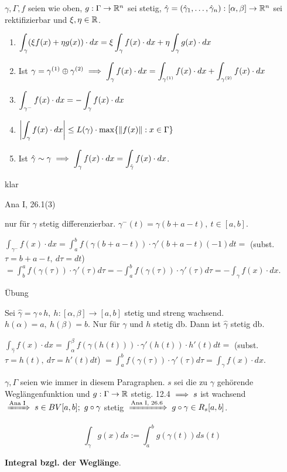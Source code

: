 \documentclass[a4paper,oneside,DIV15,BCOR12mm,chapterprefix=true,headings=onelinechapter]{scrbook}
\begin{document}
\begin{satz}
$\gamma,\Gamma,f$ seien wie oben, $g:\Gamma\to\mathbb{R}^n$ sei stetig, $\hat\gamma = (\hat{\gamma}_1,\ldots,\hat{\gamma}_n): [\alpha,\beta] \to \mathbb{R}^n$ sei rektifizierbar und $\xi,\eta \in \mathbb{R}$.
\begin{enumerate}
\item $\displaystyle{\int_\gamma(\xi f(x)+\eta g(x))\cdot dx = \xi \int_\gamma f(x)\cdot dx+\eta \int_\gamma g(x)\cdot dx}$
\item Ist $\gamma = \gamma^{(1)} \oplus \gamma^{(2)} \implies \displaystyle{\int_\gamma f(x)\cdot dx = \int_{\gamma^{(1)}} f(x)\cdot dx + \int_{\gamma^{(2)}} f(x)\cdot dx}$
\item $\displaystyle{\int_{\gamma^-} f(x)\cdot dx = -\int_\gamma f(x)\cdot dx}$
\item $\displaystyle{\left| \int_\gamma f(x)\cdot dx\right| \le L(\gamma)\cdot \max\{\|f(x)\|:x \in \Gamma\}}$
\item Ist $\displaystyle{\hat{\gamma} \sim \gamma \ensuremath{\implies}\int_\gamma f(x)\cdot dx = \int_{\hat{\gamma}} f(x)\cdot dx}$.
\end{enumerate}
\end{satz}

\begin{beweise}
\item klar
\item Ana I, 26.1(3)
\item nur für $\gamma$ stetig differenzierbar. $\gamma^-(t) = \gamma(b+a-t),\ t\in[a,b].$

$\int_{\gamma^-} f(x)\cdot dx = \int_a^b f(\gamma(b+a-t))\cdot \gamma'(b+a-t) (-1) dt =$ (subst. $\tau=b+a-t,\ d\tau = dt$) $= \int_b^a f(\gamma(\tau))\cdot\gamma'(\tau) d\tau = -\int_a^b f(\gamma(\tau))\cdot\gamma'(\tau) d\tau = -\int_\gamma f(x)\cdot dx.$
\item Übung
\item Sei $\hat{\gamma} = \gamma\circ h,\ h:[\alpha,\beta]\to[a,b]$ stetig und streng wachsend. $h(\alpha) = a,\ h(\beta) = b$. Nur für $\gamma$ und $h$ stetig db. Dann ist $\hat{\gamma}$ stetig db.

$\int_{\hat{\gamma}} f(x)\cdot dx = \int_\alpha^\beta f(\gamma(h(t)))\cdot \gamma'(h(t))\cdot h'(t) dt =$ (subst. $\tau = h(t),\ d\tau = h'(t)dt$) $= \int_a^b f(\gamma(\tau))\cdot \gamma'(\tau)d\tau = \int_\gamma f(x)\cdot dx.$
\end{beweise}

\begin{definition}
$\gamma,\Gamma$ seien wie immer in diesem Paragraphen. $s$ sei die zu $\gamma$ gehörende Weglängenfunktion und $g:\Gamma \to \mathbb{R}$ stetig. 12.4 $\implies s$ ist wachsend $\folgtnach{Ana I} s \in BV[a,b];\ g\circ\gamma$ stetig $\folgtnach{Ana I, 26.6} g\circ\gamma \in R_s[a,b]$.

$$\int_\gamma g(x) ds := \int_a^b g(\gamma(t))ds(t)$$

\textbf{Integral bzgl. der Weglänge}.
\end{definition}
\end{document}
